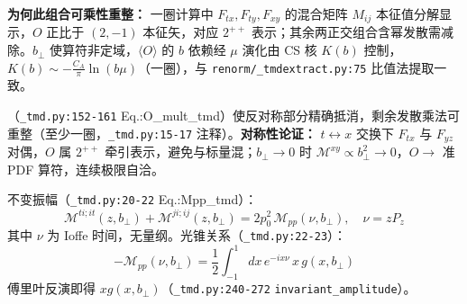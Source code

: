 \documentclass[UTF8]{ctexart}
\begin{document}
\begin{keybox}
\textbf{为何此组合可乘性重整：} 一圈计算中 $F_{tx},F_{ty},F_{xy}$ 的混合矩阵 $M_{ij}$ 本征值分解显示，$O$ 正比于 $(2, -1)$ 本征矢，对应 $2^{++}$ 表示；其余两正交组合含幂发散需减除。$b_\perp$ 使算符非定域，$\langle O\rangle$ 的 $b$ 依赖经 $\mu$ 演化由 CS 核 $K(b)$ 控制，$K(b)\sim -\frac{C_A}{\pi}\ln(b\mu)$（一圈），与 \texttt{\nolinkurl{renorm/\_tmdextract.py:75}} 比值法提取一致。
\end{keybox}

（\texttt{\nolinkurl{\_tmd.py:152-161}} Eq.:O\_mult\_tmd）使反对称部分精确抵消，剩余发散乘法可重整（至少一圈，\texttt{\nolinkurl{\_tmd.py:15-17}} 注释）。\textbf{对称性论证：} $t\leftrightarrow x$ 交换下 $F_{tx}$ 与 $F_{yz}$ 对偶，$O$ 属 $2^{++}$ 牵引表示，避免与标量混；$b_\perp\to0$ 时 $\mathcal{M}^{xy}\propto b_\perp^2\to0$，$O\to$ 准 PDF 算符，连续极限自洽。

不变振幅（\texttt{\nolinkurl{\_tmd.py:20-22}} Eq.:Mpp\_tmd）：
\begin{equation}
\mathcal{M}^{ti;it}(z,b_\perp)+\mathcal{M}^{ji;ij}(z,b_\perp)=2p_0^2\,\mathcal{M}_{pp}(\nu,b_\perp),\quad \nu=zP_z
\label{eq:Mpp}
\end{equation}
其中 $\nu$ 为 Ioffe 时间，无量纲。光锥关系（\texttt{\nolinkurl{\_tmd.py:22-23}}）：
\begin{equation}
-\mathcal{M}_{pp}(\nu,b_\perp)=\frac12\int_{-1}^1 dx\,e^{-ix\nu}\,x\,g(x,b_\perp)
\label{eq:MppPDF}
\end{equation}
傅里叶反演即得 $xg(x,b_\perp)$（\texttt{\nolinkurl{\_tmd.py:240-272}} \texttt{\nolinkurl{invariant\_amplitude}}）。
\end{document}
